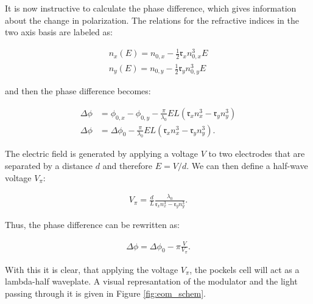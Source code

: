 It is now instructive to calculate the phase difference, which gives information about the change in polarization. The relations for the refractive indices in the two axis basis are labeled as:

\begin{align}
	n_x(E) = n_{0,x} - \frac{1}{2} \mathfrak{r}_x n_{0,x}^3 E \\
	n_y(E) = n_{0,y} - \frac{1}{2} \mathfrak{r}_y n_{0,y}^3 E
\end{align}

and then the phase difference becomes:

\begin{align}
	\Delta \phi & = \phi_{0,x} - \phi_{0,y} - \frac{\pi}{\lambda_0} E L \left(\mathfrak{r}_x n_x^3 - \mathfrak{r}_y n_y^3\right) \\
	\Delta \phi & = \Delta \phi_{0} - \frac{\pi}{\lambda_0} E L \left(\mathfrak{r}_x n_x^3 - \mathfrak{r}_y n_y^3\right) .
\end{align}

\begin{figure}[t]
\end{figure}

The electric field is generated by applying a voltage $V$ to two electrodes that are separated by a distance $d$ and therefore $E = V/d$. We can then define a half-wave voltage $V_\pi$:

\begin{align}
	V_\pi = \frac{d}{L} \frac{\lambda_0}{\mathfrak{r}_x n_x^3 - \mathfrak{r}_y n_y^3}.
\end{align}

Thus, the phase difference can be rewritten as:

\begin{align}
	\label{eq:eom_phase_diff}
	\Delta \phi = \Delta \phi_0 - \pi \frac{V}{V_\pi} .
\end{align}

With this it is clear, that applying the voltage $V_\pi$, the pockels cell will act as a lambda-half waveplate. A visual represantation of the modulator and the light passing through it is given in Figure \ref{fig:eom_schem}.

